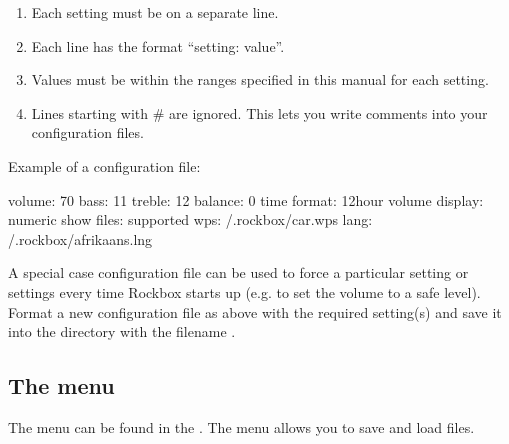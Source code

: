\begin{enumerate} 
\item Each setting must be on a separate line. 
\item Each line has the format ``setting: value''. 
\item Values must be within the ranges specified in this manual for each 
  setting. 
\item Lines starting with \# are ignored. This lets you write comments into 
  your configuration files. 
\end{enumerate}

Example of a configuration file:
\begin{example}
    volume: 70
    bass: 11
    treble: 12
    balance: 0
    time format: 12hour
    volume display: numeric
    show files: supported
    wps: /.rockbox/car.wps
    lang: /.rockbox/afrikaans.lng
\end{example}


  A special case configuration file can be used to force a particular setting
  or settings every time Rockbox starts up (e.g. to set the volume to a safe
  level). Format a new configuration file as above with the required setting(s)
  and save it into the  directory with the filename
  .

\subsection{\label{ref:manage_settings_menu}The  
  menu} The  menu can be found in the . The  menu allows you to save and load 
   files.

